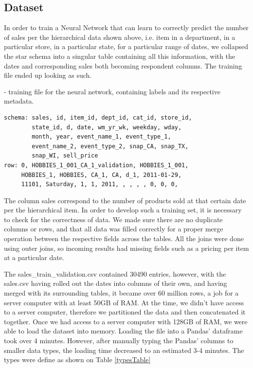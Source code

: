 \documentclass[10pt,twocolumn,letterpaper]{article}
\begin{document}
\subsection{Dataset}
  In order to train a Neural Network that can learn to correctly predict the
  number of sales per the hierarchical data shown above, i.e. item in a
  department, in a particular store, in a particular state, for a particular
  range of dates, we collapsed the star schema into a singular table containing
  all this information, with the dates and corresponding sales both
  becoming respondent columns. The training file ended up looking as such.

 - training file for the neural network, containing
labels and its respective metadata.

{\scriptsize\begin{verbatim}
schema: sales, id, item_id, dept_id, cat_id, store_id,
        state_id, d, date, wm_yr_wk, weekday, wday,
        month, year, event_name_1, event_type_1,
        event_name_2, event_type_2, snap_CA, snap_TX,
        snap_WI, sell_price
row: 0, HOBBIES_1_001_CA_1_validation, HOBBIES_1_001,
     HOBBIES_1, HOBBIES, CA_1, CA, d_1, 2011-01-29,
     11101, Saturday, 1, 1, 2011, , , , , 0, 0, 0,
\end{verbatim}}


The column sales correspond to the number of products sold at that certain date
per the hierarchical item. In order to develop such a training set, it is
necessary to check for the correctness of data. We made sure there are no
duplicate columns or rows, and that all data was filled correctly for a proper
merge operation between the respective fields across the tables. All the joins
were done using outer joins, so incoming results had missing fields such as a
pricing per item at a particular date.

 The sales\_train\_validation.csv contained 30490 entries, however, with the
sales.csv having rolled out the dates into columns of their own, and having
merged with its surrounding tables, it became over 60 million rows, a job for a
server computer with at least 50GB of RAM. At the time, we didn't have access to
a server computer, therefore we partitioned the data and then concatenated it
together. Once we had access to a server computer with 128GB of RAM, we were
able to load the dataset into memory. Loading the file into a Pandas' dataframe
took over 4 minutes. However, after manually typing the Pandas' columns to
smaller data types, the loading time decreased to an estimated 3-4 minutes. The
types were define as shown on Table \ref{typesTable}
\end{document}
